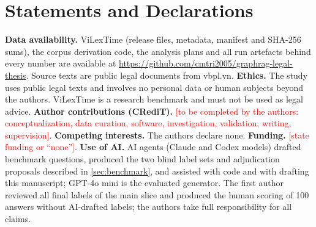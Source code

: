\documentclass[conference]{IEEEtran}
\newcommand{\TBD}[1]{\textcolor{red}{[#1]}}
\begin{document}
\section*{Statements and Declarations}
\footnotesize
\textbf{Data availability.} ViLexTime (release files, metadata, manifest and SHA-256 sums), the corpus derivation code, the analysis plans and all run artefacts behind every number are available at \url{https://github.com/cmtri2005/graphrag-legal-thesis}. Source texts are public legal documents from vbpl.vn. \textbf{Ethics.} The study uses public legal texts and involves no personal data or human subjects beyond the authors. ViLexTime is a research benchmark and must not be used as legal advice. \textbf{Author contributions (CRediT).} \TBD{to be completed by the authors: conceptualization, data curation, software, investigation, validation, writing, supervision}. \textbf{Competing interests.} The authors declare none. \textbf{Funding.} \TBD{state funding or ``none''}. \textbf{Use of AI.} AI agents (Claude and Codex models) drafted benchmark questions, produced the two blind label sets and adjudication proposals described in \cref{sec:benchmark}, and assisted with code and with drafting this manuscript; GPT-4o mini is the evaluated generator. The first author reviewed all final labels of the main slice and produced the human scoring of 100 answers without AI-drafted labels; the authors take full responsibility for all claims.



\end{document}
